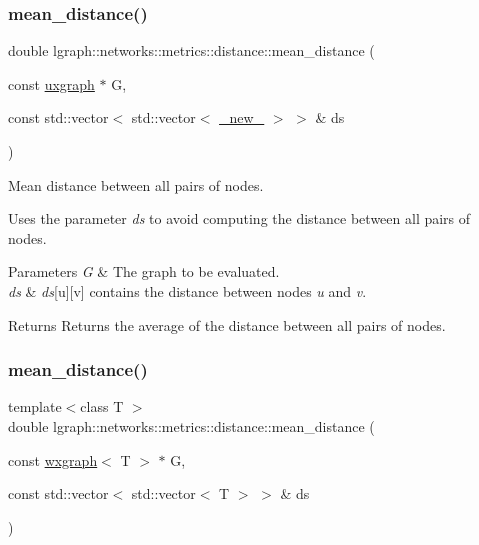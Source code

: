 \subsubsection{\texorpdfstring{mean\+\_\+distance()}{mean\_distance()}\hspace{0.1cm}{\footnotesize\ttfamily [3/4]}}
{\footnotesize\ttfamily double lgraph\+::networks\+::metrics\+::distance\+::mean\+\_\+distance (\begin{DoxyParamCaption}\item[{const \hyperlink{classlgraph_1_1uxgraph}{uxgraph} $\ast$}]{G,  }\item[{const std\+::vector$<$ std\+::vector$<$ \hyperlink{namespacelgraph_aa930092705699c3af78e3a4de7880a3f}{\+\_\+new\+\_\+} $>$ $>$ \&}]{ds }\end{DoxyParamCaption})}



Mean distance between all pairs of nodes. 

Uses the parameter {\itshape ds} to avoid computing the distance between all pairs of nodes.


\begin{DoxyParams}{Parameters}
{\em G} & The graph to be evaluated. \\
\hline
{\em ds} & {\itshape ds}\mbox{[}u\mbox{]}\mbox{[}v\mbox{]} contains the distance between nodes {\itshape u} and {\itshape v}. \\
\hline
\end{DoxyParams}
\begin{DoxyReturn}{Returns}
Returns the average of the distance between all pairs of nodes. 
\end{DoxyReturn}
\mbox{\label{namespacelgraph_1_1networks_1_1metrics_1_1distance_a9fac278edc61e5d86776b7243b6f793a}} 
\subsubsection{\texorpdfstring{mean\+\_\+distance()}{mean\_distance()}\hspace{0.1cm}{\footnotesize\ttfamily [4/4]}}
{\footnotesize\ttfamily template$<$class T $>$ \\
double lgraph\+::networks\+::metrics\+::distance\+::mean\+\_\+distance (\begin{DoxyParamCaption}\item[{const \hyperlink{classlgraph_1_1wxgraph}{wxgraph}$<$ T $>$ $\ast$}]{G,  }\item[{const std\+::vector$<$ std\+::vector$<$ T $>$ $>$ \&}]{ds }\end{DoxyParamCaption})}



